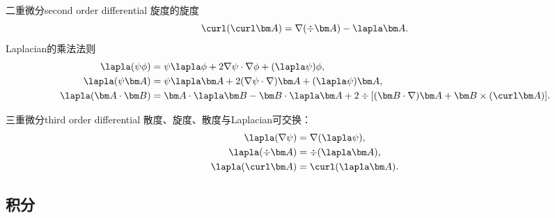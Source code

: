 \begin{theorem}
    {二重微分}{second order differential}
    旋度的旋度
    \begin{equation}
        \label{eqn:curlcurl}
        \curl(\curl\bm A)=\nabla(\div\bm A)-\lapla\bm A.
    \end{equation}
    Laplacian的乘法法则
    \begin{align}
        \lapla(\psi\phi)&=\psi\lapla\phi+2\nabla\psi\cdot\nabla\phi+(\lapla\psi)\phi,\\
        \lapla(\psi\bm A)&=\psi\lapla\bm A+2(\nabla\psi\cdot\nabla)\bm A+(\lapla\psi)\bm A,\\
        \lapla(\bm A\cdot\bm B)&=\bm A\cdot\lapla\bm B-\bm B\cdot\lapla\bm A+2\div[(\bm B\cdot\nabla)\bm A+\bm B\times(\curl\bm A)].
    \end{align}
\end{theorem}

\begin{theorem}
    {三重微分}{third order differential}
    散度、旋度、散度与Laplacian可交换：
    \begin{align}
        \lapla(\nabla\psi)&=\nabla(\lapla\psi),\\
        \lapla(\div\bm A)&=\div(\lapla\bm A),\\
        \lapla(\curl\bm A)&=\curl(\lapla\bm A).
    \end{align}
\end{theorem}

\subsection{积分}
\label{ssec:integral calculus}

